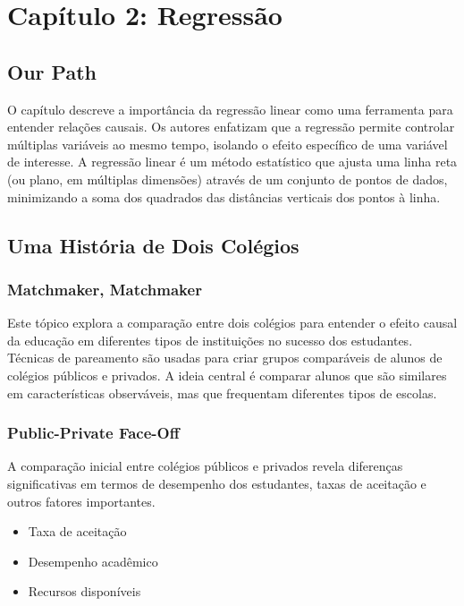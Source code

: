 \documentclass[a4paper,12pt]{article}[abntex2]
\begin{document}
\newpage

\section{Capítulo 2: Regressão}

\subsection*{Our Path}

O capítulo descreve a importância da regressão linear como uma ferramenta para entender relações causais. Os autores enfatizam que a regressão permite controlar múltiplas variáveis ao mesmo tempo, isolando o efeito específico de uma variável de interesse. A regressão linear é um método estatístico que ajusta uma linha reta (ou plano, em múltiplas dimensões) através de um conjunto de pontos de dados, minimizando a soma dos quadrados das distâncias verticais dos pontos à linha.

\subsection{Uma História de Dois Colégios}

\subsubsection*{Matchmaker, Matchmaker}

Este tópico explora a comparação entre dois colégios para entender o efeito causal da educação em diferentes tipos de instituições no sucesso dos estudantes. Técnicas de pareamento são usadas para criar grupos comparáveis de alunos de colégios públicos e privados. A ideia central é comparar alunos que são similares em características observáveis, mas que frequentam diferentes tipos de escolas.

\subsubsection*{Public-Private Face-Off}

A comparação inicial entre colégios públicos e privados revela diferenças significativas em termos de desempenho dos estudantes, taxas de aceitação e outros fatores importantes.

\begin{itemize}
    \item Taxa de aceitação
    \item Desempenho acadêmico
    \item Recursos disponíveis
\end{itemize}
\end{document}
